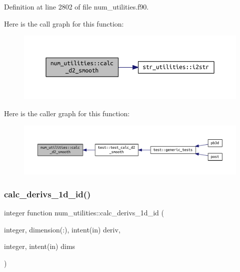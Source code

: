 Definition at line 2802 of file num\+\_\+utilities.\+f90.

Here is the call graph for this function\+:\nopagebreak
\begin{figure}[H]
\begin{center}
\leavevmode
\includegraphics[width=350pt]{namespacenum__utilities_ab4c91a6478c4dd6f519f8ccbccc4094f_cgraph}
\end{center}
\end{figure}
Here is the caller graph for this function\+:\nopagebreak
\begin{figure}[H]
\begin{center}
\leavevmode
\includegraphics[width=350pt]{namespacenum__utilities_ab4c91a6478c4dd6f519f8ccbccc4094f_icgraph}
\end{center}
\end{figure}
\mbox{\label{namespacenum__utilities_af2e9ffd7ce2f9391bf8b6f1c344fabca}} 
\subsubsection{\texorpdfstring{calc\+\_\+derivs\+\_\+1d\+\_\+id()}{calc\_derivs\_1d\_id()}}
{\footnotesize\ttfamily integer function num\+\_\+utilities\+::calc\+\_\+derivs\+\_\+1d\+\_\+id (\begin{DoxyParamCaption}\item[{integer, dimension(\+:), intent(in)}]{deriv,  }\item[{integer, intent(in)}]{dims }\end{DoxyParamCaption})}



